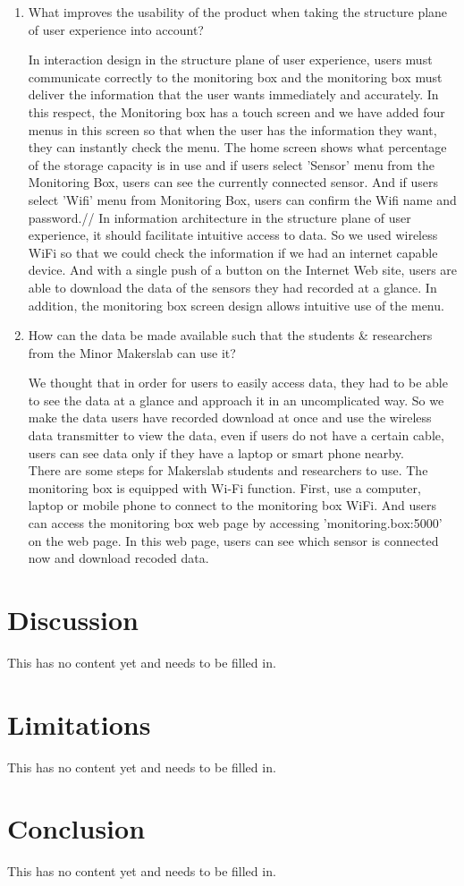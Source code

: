 \documentclass{report}
\begin{document}
\begin{enumerate}
\item What improves the usability of the product when taking the structure plane of user experience into account?

In interaction design in the structure plane of user experience, users must communicate correctly to the monitoring box and the monitoring box must deliver the information that the user wants immediately and accurately. In this respect, the Monitoring box has a touch screen and we have added four menus in this screen so that when the user has the information they want, they can instantly check the menu. The home screen shows what percentage of the storage capacity is in use and if users select 'Sensor' menu from the Monitoring Box, users can see the currently connected sensor. And if users select 'Wifi' menu from Monitoring Box, users can confirm the Wifi name and password.//
In information architecture in the structure plane of user experience, it should facilitate intuitive access to data. So we used wireless WiFi so that we could check the information if we had an internet capable device. And with a single push of a button on the Internet Web site, users are able to download the data of the sensors they had recorded at a glance. In addition, the monitoring box screen design allows intuitive use of the menu.


\item How can the data be made available such that the students \& researchers from the Minor Makerslab can use it?

We thought that in order for users to easily access data, they had to be able to see the data at a glance and approach it in an uncomplicated way. So we make the data users have recorded download at once and use the wireless data transmitter to view the data, even if users do not have a certain cable, users can see data only if they have a laptop or smart phone nearby. \\
There are some steps for Makerslab students and researchers to use. The monitoring box is equipped with Wi-Fi function. First, use a computer, laptop or mobile phone to connect to the monitoring box WiFi. And users can access the monitoring box web page by accessing 'monitoring.box:5000' on the web page. In this web page, users can see which sensor is connected now and download recoded data. 
\end{enumerate}
\chapter{Discussion}
This has no content yet and needs to be filled in. 

\chapter{Limitations}
This has no content yet and needs to be filled in. 

\chapter{Conclusion}
This has no content yet and needs to be filled in. 


\end{document}
